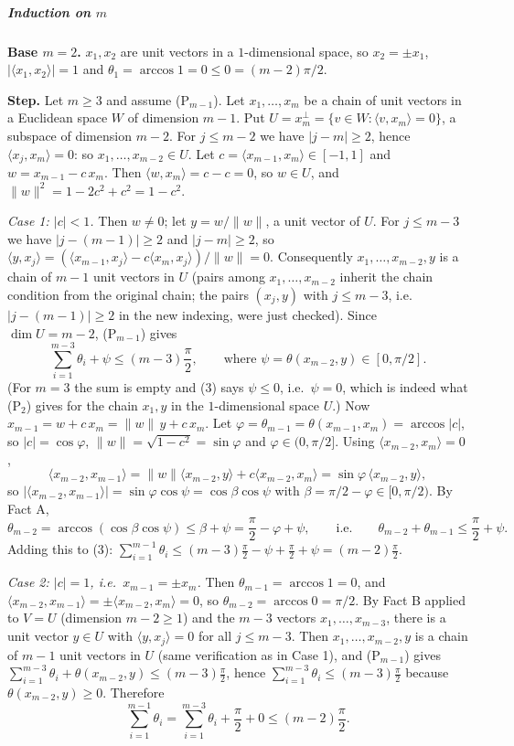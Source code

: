 \subparagraph{\texorpdfstring{Induction on
\(m\)}{Induction on m}}\label{induction-on-m}

\textbf{Base \(m=2\).} \(x_1,x_2\) are unit vectors in a
\(1\)-dimensional space, so \(x_2=\pm x_1\),
\(|\langle x_1,x_2\rangle|=1\) and
\(\theta_1=\arccos 1=0\le0=(m-2)\pi/2\).

\textbf{Step.} Let \(m\ge3\) and assume (P\(_{m-1}\)). Let
\(x_1,\dots,x_m\) be a chain of unit vectors in a Euclidean space \(W\)
of dimension \(m-1\). Put
\(U=x_m^{\perp}=\{v\in W:\langle v,x_m\rangle=0\}\), a subspace of
dimension \(m-2\). For \(j\le m-2\) we have \(|j-m|\ge2\), hence
\(\langle x_j,x_m\rangle=0\): so \(x_1,\dots,x_{m-2}\in U\). Let
\(c=\langle x_{m-1},x_m\rangle\in[-1,1]\) and \(w=x_{m-1}-c\,x_m\). Then
\(\langle w,x_m\rangle=c-c=0\), so \(w\in U\), and
\(\|w\|^2=1-2c^2+c^2=1-c^2\).

\emph{Case 1: \(|c|<1\).} Then \(w\neq0\); let \(y=w/\|w\|\), a unit
vector of \(U\). For \(j\le m-3\) we have \(|j-(m-1)|\ge2\) and
\(|j-m|\ge2\), so
\(\langle y,x_j\rangle=(\langle x_{m-1},x_j\rangle-c\langle x_m,x_j\rangle)/\|w\|=0\).
Consequently \(x_1,\dots,x_{m-2},y\) is a chain of \(m-1\) unit vectors
in \(U\) (pairs among \(x_1,\dots,x_{m-2}\) inherit the chain condition
from the original chain; the pairs \((x_j,y)\) with \(j\le m-3\),
i.e.~\(|j-(m-1)|\ge2\) in the new indexing, were just checked). Since
\(\dim U=m-2\), (P\(_{m-1}\)) gives
\[\sum_{i=1}^{m-3}\theta_i+\psi\le(m-3)\frac{\pi}{2},\qquad\text{where }\psi=\theta(x_{m-2},y)\in[0,\pi/2].\tag{3}\]
(For \(m=3\) the sum is empty and (3) says \(\psi\le0\),
i.e.~\(\psi=0\), which is indeed what (P\(_2\)) gives for the chain
\(x_1,y\) in the \(1\)-dimensional space \(U\).) Now
\(x_{m-1}=w+c\,x_m=\|w\|\,y+c\,x_m\). Let
\(\varphi=\theta_{m-1}=\theta(x_{m-1},x_m)=\arccos|c|\), so
\(|c|=\cos\varphi\), \(\|w\|=\sqrt{1-c^2}=\sin\varphi\) and
\(\varphi\in(0,\pi/2]\). Using \(\langle x_{m-2},x_m\rangle=0\),
\[\langle x_{m-2},x_{m-1}\rangle=\|w\|\langle x_{m-2},y\rangle+c\langle x_{m-2},x_m\rangle=\sin\varphi\,\langle x_{m-2},y\rangle,\]
so
\(|\langle x_{m-2},x_{m-1}\rangle|=\sin\varphi\cos\psi=\cos\beta\cos\psi\)
with \(\beta=\pi/2-\varphi\in[0,\pi/2)\). By Fact A,
\[\theta_{m-2}=\arccos(\cos\beta\cos\psi)\le\beta+\psi=\frac{\pi}{2}-\varphi+\psi,\qquad\text{i.e.}\qquad \theta_{m-2}+\theta_{m-1}\le\frac{\pi}{2}+\psi.\]
Adding this to (3):
\(\sum_{i=1}^{m-1}\theta_i\le(m-3)\frac{\pi}{2}-\psi+\frac{\pi}{2}+\psi=(m-2)\frac{\pi}{2}\).

\emph{Case 2: \(|c|=1\), i.e.~\(x_{m-1}=\pm x_m\).} Then
\(\theta_{m-1}=\arccos1=0\), and
\(\langle x_{m-2},x_{m-1}\rangle=\pm\langle x_{m-2},x_m\rangle=0\), so
\(\theta_{m-2}=\arccos0=\pi/2\). By Fact B applied to \(V=U\) (dimension
\(m-2\ge1\)) and the \(m-3\) vectors \(x_1,\dots,x_{m-3}\), there is a
unit vector \(y\in U\) with \(\langle y,x_j\rangle=0\) for all
\(j\le m-3\). Then \(x_1,\dots,x_{m-2},y\) is a chain of \(m-1\) unit
vectors in \(U\) (same verification as in Case 1), and (P\(_{m-1}\))
gives
\(\sum_{i=1}^{m-3}\theta_i+\theta(x_{m-2},y)\le(m-3)\frac{\pi}{2}\),
hence \(\sum_{i=1}^{m-3}\theta_i\le(m-3)\frac{\pi}{2}\) because
\(\theta(x_{m-2},y)\ge0\). Therefore
\[\sum_{i=1}^{m-1}\theta_i=\sum_{i=1}^{m-3}\theta_i+\frac{\pi}{2}+0\le(m-2)\frac{\pi}{2}.\]

